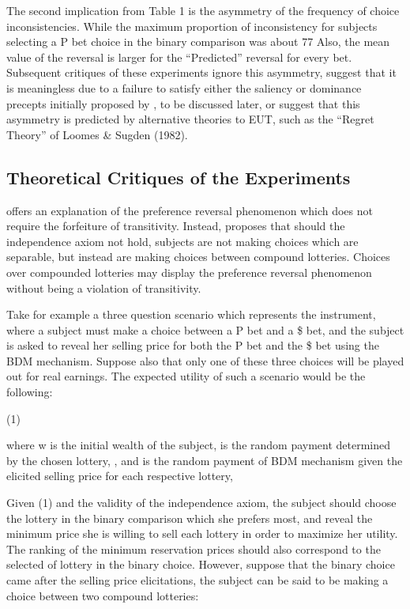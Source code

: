The second implication from Table 1 is the asymmetry of the frequency of choice inconsistencies.
While the maximum proportion of inconsistency for subjects selecting a P bet choice in the binary comparison was about 77%
Also, the  mean value of the reversal is larger for the \enquote{Predicted} reversal for every bet.
Subsequent critiques of these experiments ignore this asymmetry, suggest that it is meaningless due to a failure to satisfy either the saliency or dominance precepts initially proposed by \textcite{Smith1982}, to be discussed later, or suggest that this asymmetry is predicted by alternative theories to EUT, such as the \enquote{Regret Theory} of  Loomes \& Sugden (1982).

\subsection{Theoretical Critiques of the \texorpdfstring{\textcite{Grether1979}}{Grether \& Plott (1979)} Experiments}

\textcite{Holt1986} offers an explanation of the preference reversal phenomenon which does not require the forfeiture of transitivity.
Instead, \textcite{Holt1986} proposes that should the independence axiom not hold, subjects are not making choices which are separable, but instead are making choices between compound lotteries.
Choices over compounded lotteries may display the preference reversal phenomenon without being a violation of transitivity.

Take for example a three question scenario which represents the \textcite{Grether1979} instrument, where a subject must make a choice between a P bet and a \$ bet, and the subject is asked to reveal her selling price for both the P bet and the \$ bet using the BDM mechanism.
Suppose also that only one of these three choices will be played out for real earnings.
The expected utility of such a scenario would be the following:

(1)	

where w is the initial wealth of the subject,  is the random payment determined by the chosen lottery, , and  is the random payment of BDM mechanism given the elicited selling price  for each respective lottery,

Given (1) and the validity of the independence axiom, the subject should choose the lottery in the binary comparison which she prefers most, and reveal the minimum price she is willing to sell each lottery in order to maximize her utility.
The ranking of the minimum reservation prices should also correspond to the selected of lottery in the binary choice.
However, suppose that the binary choice came after the selling price elicitations, the subject can be said to be making a choice between two compound lotteries:

